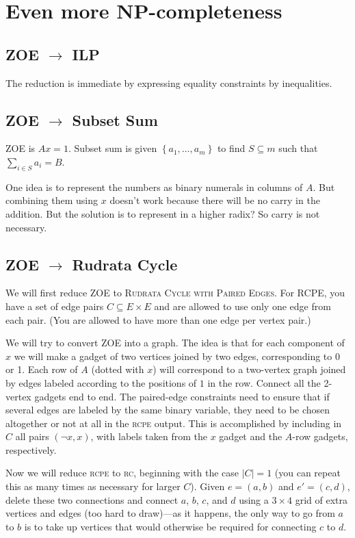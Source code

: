\chapter{Even more NP-completeness}
\section{ZOE \(\to\) ILP}
The reduction is immediate by expressing equality constraints by inequalities.
\section{ZOE \(\to\) Subset Sum}
ZOE is \(Ax = 1\). Subset sum is given \(\left\{a_1,\ldots,a_m\right\}\) to find \(S\subseteq m\) such that \(\sum_{i\in S} a_i = B\).

One idea is to represent the numbers as binary numerals in columns of \(A\). But combining them using \(x\) doesn't work because there will be no carry in the addition.
But the solution is to represent in a higher radix? So carry is not necessary.

\section{ZOE \(\to\) Rudrata Cycle}
We will first reduce ZOE to \textsc{Rudrata Cycle with Paired Edges}.
For RCPE, you have a set of edge pairs \(C \subseteq E\times E\) and are
allowed to use only one edge from each pair. (You are allowed to have more than one edge per vertex pair.)

We will try to convert ZOE into a graph. The idea is that for each
component of \(x\) we will make a gadget of two vertices joined by two edges,
corresponding to 0 or 1.
Each row of \(A\) (dotted with \(x\)) will correspond to a two-vertex graph joined by edges labeled according to the positions of \(1\) in the row.
Connect all the 2-vertex gadgets end to end.
The paired-edge constraints need to ensure that if several edges are labeled by the same binary variable, they need to be chosen altogether or not at all in the \textsc{rcpe} output. This is accomplished by including in \(C\) all pairs \((\lnot x, x)\), with labels taken  from the \(x\) gadget and the \(A\)-row gadgets, respectively.

Now we will reduce \textsc{rcpe} to \textsc{rc}, beginning with the case
\(\left|C\right| = 1\) (you can repeat this as many times as necessary for larger \(C\)).
Given \(e = \left(a, b\right)\) and \(e' = \left(c, d\right)\), delete these two connections and connect \(a\), \(b\), \(c\), and \(d\) using a \(3\times 4\)
grid of extra vertices and edges (too hard to draw)---as it happens, the only way to go from \(a\) to \(b\) is to take up vertices that would otherwise be required for connecting \(c\) to \(d\).

